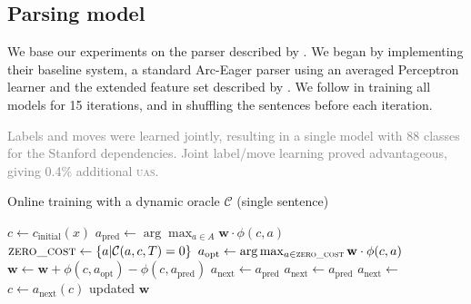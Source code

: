 \documentclass[11pt,letterpaper]{article}
\newcommand{\uas}{\textsc{uas}\xspace}
\newcommand{\maybe}[1]{\textcolor{gray}{#1}}
\begin{document}
\subsection{Parsing model}

We base our experiments on the parser described by \citet{goldberg:12}. We
began by implementing their baseline system, a standard Arc-Eager parser using
an averaged Perceptron learner and the extended feature set described by \citet{zhang:11}.
We follow \citet{goldberg:12} in training all models for 15 iterations,
and in shuffling the sentences before each iteration.

\maybe{
Labels and moves were learned jointly, resulting in a single model with 88 classes
for the Stanford dependencies. Joint label/move learning proved 
advantageous, giving 0.4\% additional \uas.}

%
%
\begin{algorithm}[tb]
   \caption{Online training with a dynamic oracle $\mathcal{C}$ (single sentence)}
   \label{alg:explore-online-training}
\begin{algorithmic}[1]
      \State $c \gets c_{\text{initial}}(x)$
            \State $a_{\text{pred}} \gets \arg\max_{a\in A} \mathbf{w} \cdot \phi(c,a)$
            \State $\textsc{zero\_cost} \gets \{a | \mathcal{C}(a, c, T) = 0\}$
            \State $a_\text{opt} \gets \arg\max_{a \in \textsc{zero\_cost}}\mathbf{w} \cdot \phi(c,a)$
            \State $\mathbf{w} \gets \mathbf{w} + \phi(c,a_\text{opt}) - \phi(c,a_\text{pred})$
            \EndIf
             \State $a_\text{next} \gets a_\text{pred}$ 
             \State $a_\text{next} \gets a_\text{pred}$
            \Else \State $a_\text{next} \gets$ 
            \EndIf
            \State $c \gets a_\text{next}(c)$
            \EndWhile
      \State \Return updated $\mathbf{w}$
\end{algorithmic}
\end{algorithm}
\end{document}
